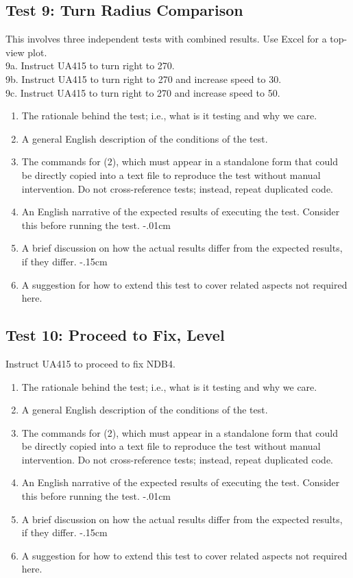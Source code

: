 \documentclass[letterpaper, 12pt]{article}
\begin{document}
\subsection{Test 9: Turn Radius Comparison}
This involves three independent tests with combined results. Use Excel for a top-view plot.\\
9a. Instruct UA415 to turn right to 270.\\
9b. Instruct UA415 to turn right to 270 and increase speed to 30.\\
9c. Instruct UA415 to turn right to 270 and increase speed to 50.
\begin{enumerate}\itemsep-.15cm
\item The rationale behind the test; i.e., what is it testing and why we care.
\item A general English description of the conditions of the test.
\item The commands for (2), which must appear in a standalone form that could be directly copied into a text file to reproduce the test without manual intervention. Do not cross-reference tests; instead, repeat duplicated code.
\item An English narrative of the expected results of executing the test. Consider this before running the test.
\itemsep-.01cm
\item A brief discussion on how the actual results differ from the expected results, if they differ.
\itemsep-.15cm
\item A suggestion for how to extend this test to cover related aspects not required here.
\end{enumerate}

\subsection{Test 10: Proceed to Fix, Level}
Instruct UA415 to proceed to fix NDB4.
\begin{enumerate}\itemsep-.15cm
\item The rationale behind the test; i.e., what is it testing and why we care.
\item A general English description of the conditions of the test.
\item The commands for (2), which must appear in a standalone form that could be directly copied into a text file to reproduce the test without manual intervention. Do not cross-reference tests; instead, repeat duplicated code.
\item An English narrative of the expected results of executing the test. Consider this before running the test.
\itemsep-.01cm
\item A brief discussion on how the actual results differ from the expected results, if they differ.
\itemsep-.15cm
\item A suggestion for how to extend this test to cover related aspects not required here.
\end{enumerate}
\end{document}
